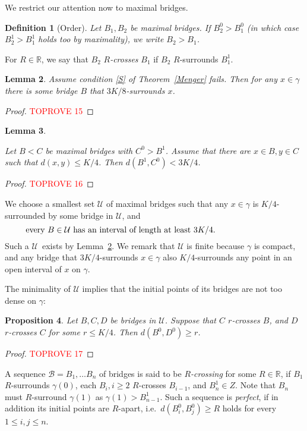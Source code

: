 \documentclass[a4paper]{article}
\newcommand{\defi}[1]{{\color{darkgray}\emph{#1}}}
\newtheorem{proposition}{Proposition}[section]
\newtheorem{definition}[proposition]{Definition}
\newtheorem{lemma}[proposition]{Lemma}
\newcommand{\R}{\ensuremath{\mathbb R}}
\newcommand{\cb}{\ensuremath{\mathcal B}}
\newcommand{\cu}{\ensuremath{\mathcal U}}
\newcommand{\Lr}[1]{Lemma~\ref{#1}}
\newcommand{\Tr}[1]{Theorem~\ref{#1}}
\newcommand{\fe}{for every}
\newcommand{\labtequ}[2]{\begin{equation} \label{#1} 	\begin{minipage}[c]{0.9\textwidth}  #2 \end{minipage} \ignorespacesafterend \end{equation} }
\begin{document}
We restrict our attention now to maximal bridges.


\begin{definition}[Order] \label{order}
Let  $B_1, B_2$ be maximal bridges. If $B_2^0 > B_1^0$ (in which case $B_2^1 > B_1^1$ holds too by maximality), we write $B_2>B_1$. 
\end{definition}


For $R\in \R$, we say that $B_2$ \defi{$R$-crosses}  $B_1$ if $B_2$ $R$-surrounds $B_1^1$. 


\begin{lemma} \label{bridge}
Assume condition \ref{S} of \Tr{Menger} fails. Then for any $x\in \gamma $ there is some bridge $B$ that $3K/8$-surrounds $x$. 
\end{lemma}
\begin{proof}\textcolor{red}{TOPROVE 15}\end{proof}

\begin{lemma} \label{disjoint}

Let $B<C$ be maximal bridges with $C^0> B^1$.
Assume that there are $x\in B, y\in C$ such that $d(x,y)\leq K/4$. Then  $d(B^1,C^0)< 3K/4$.  
\end{lemma}
\begin{proof}\textcolor{red}{TOPROVE 16}\end{proof}

We choose a smallest set $\mathcal U$ of maximal bridges such that any $x\in \gamma $ is $K/4$-surrounded by some 
bridge in $\mathcal U$, and 
\labtequ{length}{every $B\in \cu$ has an interval of length at least $3K/4$.} Such a \cu\ exists by \Lr{bridge}. We remark that $\mathcal U$ is finite because $\gamma$ is compact, and any bridge that $3K/4$-surrounds $x\in \gamma $ also $K/4$-surrounds any point in an open interval of $x$ on $\gamma$. 


The minimality of $\mathcal U$ implies that the initial points of its bridges are not too dense on $\gamma$:


\begin{proposition} \label{U i}  
Let $B,C,D$ be bridges in $\mathcal U$. Suppose that
		 $C$ $r$-crosses $B$, and $D$ $r$-crosses $C$ for some $r\leq K/4$. Then $d(B^0,D^0)\geq r$. 
\end{proposition}
\begin{proof}\textcolor{red}{TOPROVE 17}\end{proof}

A sequence $\cb= B_1, \ldots B_n$ of bridges is said to be \defi{$R$-crossing} for some $R\in \R$, if $B_1$ $R$-surrounds $\gamma(0)$, each $B_i, i\geq 2$ $R$-crosses $B_{i-1}$, and $B^1_n\in Z$. Note that $B_n$ must $R$-surround $\gamma(1)$ as $\gamma(1)> B^1_{n-1}$.
Such a sequence is \defi{perfect}, if in addition its initial points are $R$-apart, i.e.\ $d(B_i^0,B_j^0)\geq R$ holds \fe\ $1\leq i,j \leq n$.
\end{document}

